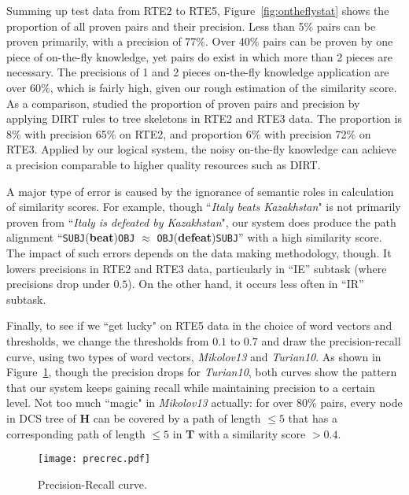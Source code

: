 \documentclass[11pt]{article}
\begin{document}
Summing up test data from RTE2 to RTE5, Figure~\ref{fig:ontheflystat} shows the proportion of 
all proven pairs and their precision. Less than 5\% pairs can be proven primarily, 
with a precision of 77\%. Over 40\% 
pairs can be proven by one piece of on-the-fly knowledge, yet pairs do exist 
in which more than 2 pieces are necessary. 
The precisions of 1 and 2 pieces on-the-fly knowledge application are over 60\%, which is fairly 
high, given our rough estimation of the similarity score. As a comparison, 
 studied the proportion of proven pairs 
and precision by applying DIRT rules to tree skeletons in RTE2 and RTE3 data. The proportion 
is 8\% with precision 65\% on RTE2, and proportion 6\% with precision 72\% on RTE3. Applied 
by our logical system, the noisy on-the-fly knowledge can achieve a precision comparable to higher 
quality resources such as DIRT.

A major type of error is caused by the ignorance of semantic roles in calculation of 
similarity scores. For example, though ``\textit{Italy beats Kazakhstan}" is not primarily proven 
from ``\textit{Italy is defeated by Kazakhstan}", our system does produce the path alignment 
``\texttt{SUBJ}(\textbf{beat})\texttt{OBJ} $\approx$ 
\texttt{OBJ}(\textbf{defeat})\texttt{SUBJ}'' with a high similarity score. 
The impact of such errors depends on the data making methodology, though. It lowers 
precisions in RTE2 and RTE3 data, particularly in ``IE'' subtask (where precisions drop under $0.5$). 
On the other hand, it occurs less often in ``IR'' subtask. 

Finally, to see if we ``get lucky" on RTE5 data in the choice of word vectors 
and thresholds, we change the thresholds from $0.1$ to $0.7$ and draw the precision-recall curve, 
using two types of word vectors, \textit{Mikolov13} and \textit{Turian10}. As shown in 
Figure~\ref{fig:precrec}, though the precision drops for \textit{Turian10}, both curves 
show the pattern that our system keeps gaining recall while maintaining precision to a certain level. 
Not too much ``magic" in \textit{Mikolov13} actually: for over 80\% pairs, every node in DCS 
tree of {\bf H} can be covered by a path of length $\leq 5$ 
that has a corresponding path of length $\leq 5$ in {\bf T} with a similarity score $>0.4$. 

\begin{figure}[t]
\centering
\texttt{[image: precrec.pdf]}
\caption{Precision-Recall curve.}
\label{fig:precrec}
\end{figure}
\end{document}
